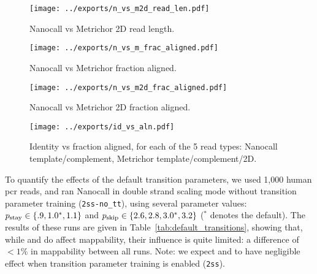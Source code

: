 \documentclass{bioinfo}
\begin{document}
\begin{figure*}[!tp]
\centerline{\texttt{[image: ../exports/n\_vs\_m2d\_read\_len.pdf]}}
\caption{Nanocall vs Metrichor 2D read length.}\label{fig:n_vs_m2d_read_len}
\end{figure*}

\begin{figure*}[!tp]
\centerline{\texttt{[image: ../exports/n\_vs\_m\_frac\_aligned.pdf]}}
\caption{Nanocall vs Metrichor fraction aligned.}\label{fig:n_vs_m_frac_aligned}
\end{figure*}

\begin{figure*}[!tp]
\centerline{\texttt{[image: ../exports/n\_vs\_m2d\_frac\_aligned.pdf]}}
\caption{Nanocall vs Metrichor 2D fraction aligned.}\label{fig:n_vs_m2d_frac_aligned}
\end{figure*}

\begin{figure*}[!tp]
\centerline{\texttt{[image: ../exports/id\_vs\_aln.pdf]}}
\caption{Identity vs fraction aligned, for each of the 5 read types: Nanocall template/complement, Metrichor template/complement/2D.}\label{fig:id_vs_aln}
\end{figure*}

To quantify the effects of the default transition parameters, we used 1,000 human pcr reads, and ran Nanocall in double strand scaling mode without transition parameter training (\texttt{2ss-no\_tt}), using several parameter values: $p_\mathrm{stay} \in \{ .9, 1.0^*, 1.1 \}$ and $p_\mathrm{skip} \in \{ 2.6, 2.8, 3.0^*, 3.2 \}$ ($^*$ denotes the default). The results of these runs are given in Table~\ref{tab:default_transitions}, showing that, while \pstay and \pskip do affect mappability, their influence is quite limited: a difference of $<1\%$ in mappability between all runs. Note: we expect \pstay and \pskip to have negligible effect when transition parameter training is enabled (\texttt{2ss}).
\end{document}
